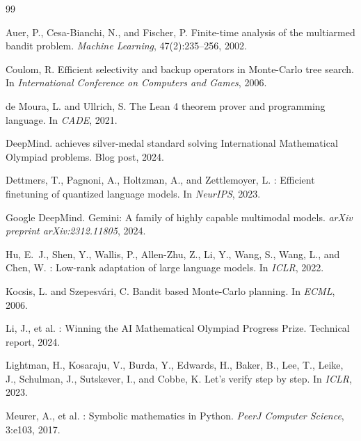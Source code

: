 \documentclass[11pt,a4paper]{article}
\begin{document}
\begin{thebibliography}{99}

Auer, P., Cesa-Bianchi, N., and Fischer, P.
\newblock Finite-time analysis of the multiarmed bandit problem.
\newblock \emph{Machine Learning}, 47(2):235--256, 2002.

Coulom, R.
\newblock Efficient selectivity and backup operators in {Monte-Carlo} tree search.
\newblock In \emph{International Conference on Computers and Games}, 2006.

de Moura, L. and Ullrich, S.
\newblock The {Lean 4} theorem prover and programming language.
\newblock In \emph{CADE}, 2021.

DeepMind.
 achieves silver-medal standard solving {International Mathematical Olympiad} problems.
\newblock Blog post, 2024.

Dettmers, T., Pagnoni, A., Holtzman, A., and Zettlemoyer, L.
: Efficient finetuning of quantized language models.
\newblock In \emph{NeurIPS}, 2023.

Google DeepMind.
\newblock Gemini: A family of highly capable multimodal models.
\newblock \emph{arXiv preprint arXiv:2312.11805}, 2024.

Hu, E.~J., Shen, Y., Wallis, P., Allen-Zhu, Z., Li, Y., Wang, S., Wang, L., and Chen, W.
: Low-rank adaptation of large language models.
\newblock In \emph{ICLR}, 2022.

Kocsis, L. and Szepesv{\'a}ri, C.
\newblock Bandit based {Monte-Carlo} planning.
\newblock In \emph{ECML}, 2006.

Li, J., et al.
: Winning the {AI Mathematical Olympiad Progress Prize}.
\newblock Technical report, 2024.

Lightman, H., Kosaraju, V., Burda, Y., Edwards, H., Baker, B., Lee, T., Leike, J., Schulman, J., Sutskever, I., and Cobbe, K.
\newblock Let's verify step by step.
\newblock In \emph{ICLR}, 2023.

Meurer, A., et al.
: Symbolic mathematics in {Python}.
\newblock \emph{PeerJ Computer Science}, 3:e103, 2017.


\end{thebibliography}
\end{document}
